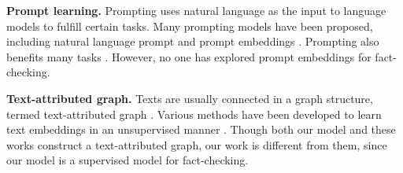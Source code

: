 \textbf{Prompt learning.} Prompting \cite{prompting} uses natural language as the input to language models to fulfill certain tasks. Many prompting models have been proposed, including natural language prompt \cite{discrete_prompting,discrete_prompting2} and prompt embeddings \cite{soft_prompting,p_tuning,p_tuning_v2,prefix_tuning}. Prompting also benefits many tasks \cite{cocoop,machine_translation}. However, no one has explored prompt embeddings for fact-checking.

\textbf{Text-attributed graph.} Texts are usually connected in a graph structure, termed text-attributed graph \cite{tag_survey}. Various methods have been developed to learn text embeddings in an unsupervised manner \cite{adjacent_encoder,dbn,semivn,hgtm,graphformers,patton,hypformer}. Though both our model and these works construct a text-attributed graph, our work is different from them, since our model is a supervised model for fact-checking.